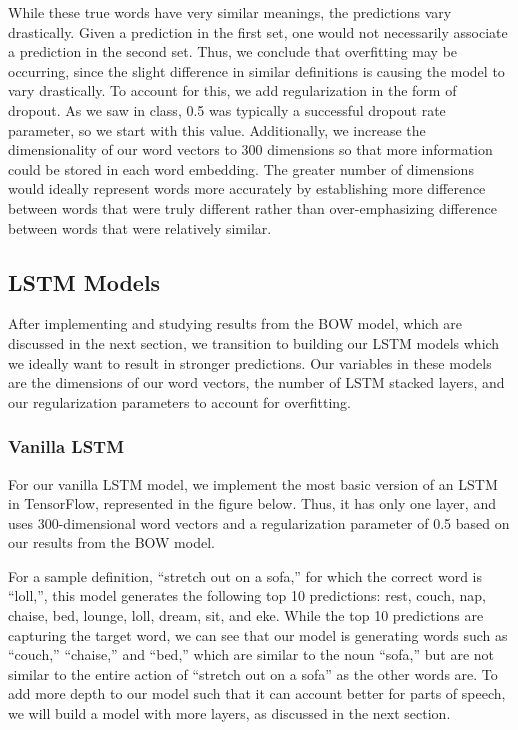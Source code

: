 \documentclass{article} %
\begin{document}
While these true words have very similar meanings, the predictions vary drastically. Given a prediction in the first set, one would not necessarily associate a prediction in the second set. 
Thus, we conclude that overfitting may be occurring, since the slight difference in similar definitions is causing the model to vary drastically. To account for this, we add regularization in the form of dropout. As we saw in class, 0.5 was typically a successful dropout rate parameter, so we start with this value.
Additionally, we increase the dimensionality of our word vectors to 300 dimensions so that more information could be stored in each word embedding. The greater number of dimensions would ideally represent words more accurately by establishing more difference between words that were truly different rather than over-emphasizing difference between words that were relatively similar. 

\subsection{LSTM Models}
After implementing and studying results from the BOW model, which are discussed in the next section, we transition to building our LSTM models which we ideally want to result in stronger predictions. Our variables in these models are the dimensions of our word vectors, the number of LSTM stacked layers, and our regularization parameters to account for overfitting. 

\subsubsection{Vanilla LSTM}
For our vanilla LSTM model, we implement the most basic version of an LSTM in TensorFlow, represented in the figure below. Thus, it has only one layer, and uses 300-dimensional word vectors and a regularization parameter of 0.5 based on our results from the BOW model.

For a sample definition, “stretch out on a sofa,” for which the correct word is “loll,”, this model generates the following top 10 predictions: rest, couch, nap, chaise, bed, lounge, loll, dream, sit, and eke.
While the top 10 predictions are capturing the target word, we can see that our model is generating words such as “couch,” “chaise,” and “bed,” which are similar to the noun “sofa,” but are not similar to the entire action of “stretch out on a sofa” as the other words are. To add more depth to our model such that it can account better for parts of speech, we will build a model with more layers, as discussed in the next section.
\end{document}
